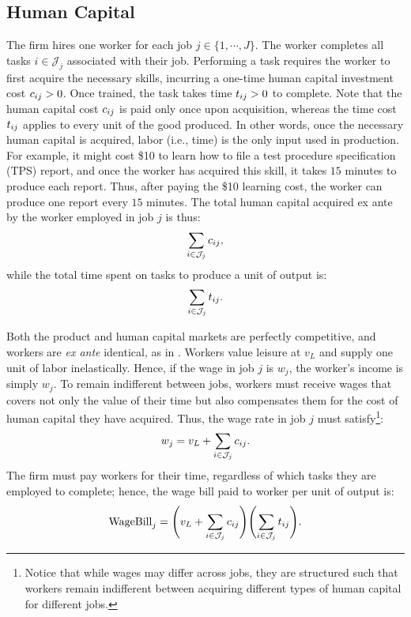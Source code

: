 \documentclass{article}
\theoremstyle{plain}
\theoremstyle{plain}
\begin{document}
\subsection{Human Capital}
The firm hires one worker for each job $j \in \{1, \cdots, J\}$.  
The worker completes all tasks $i \in \mathcal{J}_j$ associated with their job. 
Performing a task requires the worker to first acquire the necessary skills, incurring a one-time human capital investment cost \( c_{ij} > 0 \).
Once trained, the task takes time $t_{ij}>0$ to complete. 
Note that the human capital cost $c_{ij}$ is paid only once upon acquisition, whereas the time cost $t_{ij}$ applies to every unit of the good produced.
In other words, once the necessary human capital is acquired, labor (i.e., time) is the only input used in production.
For example, it might cost \$10 to learn how to file a test procedure specification (TPS) report, and once the worker has acquired this skill, it takes $15$ minutes to produce each report.
Thus, after paying the \$10 learning cost, the worker can produce one report every $15$ minutes.
The total human capital acquired ex ante by the worker employed in job $j$ is thus:
\[
\sum_{i \in \mathcal{J}_j} c_{ij},
\]
while the total time spent on tasks to produce a unit of output is:
\[
\sum_{i \in \mathcal{J}_j} t_{ij}.
\]


Both the product and human capital markets are perfectly competitive, and workers are \emph{ex ante} identical, as in \cite{becker1992division}.
Workers value leisure at $v_L$ and supply one unit of labor inelastically.
Hence, if the wage in job $j$ is $w_j$, the worker's income is simply $w_j$.
To remain indifferent between jobs, workers must receive wages that covers not only the value of their time but also compensates them for the cost of human capital they have acquired.
Thus, the wage rate in job $j$ must satisfy\footnote{Notice that while wages may differ across jobs, they are structured such that workers remain indifferent between acquiring different types of human capital for different jobs.}:
\begin{align}
\label{eq:wage}
w_j = v_L + \sum_{i \in \mathcal{J}_j} c_{ij}.
\end{align}
The firm must pay workers for their time, regardless of which tasks they are employed to complete; hence, the wage bill paid to worker per unit of output is:
\begin{align}
\label{eq:wagebill}
\text{WageBill}_j = \Biggl(v_L + \sum_{i \in \mathcal{J}_j} c_{ij} \Biggr) \Biggl(\sum_{i \in \mathcal{J}_j} t_{ij} \Biggr).
\end{align}
\end{document}

